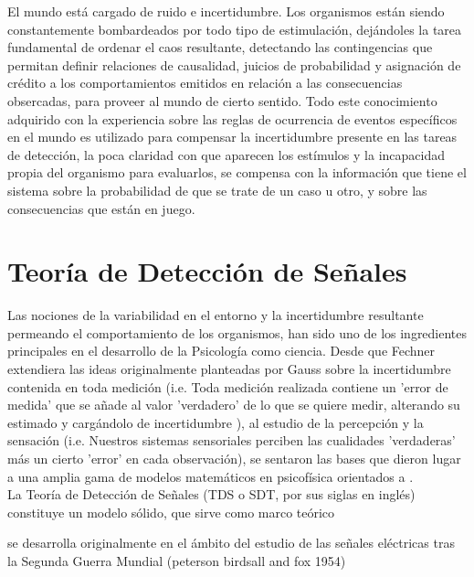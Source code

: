 El mundo está cargado de ruido e incertidumbre. Los organismos están siendo constantemente bombardeados por todo tipo de estimulación, dejándoles la tarea fundamental de ordenar el caos resultante, detectando las contingencias que permitan definir relaciones de causalidad, juicios de probabilidad y asignación de crédito a los comportamientos emitidos en relación a las consecuencias obsercadas, para proveer al mundo de cierto sentido. Todo este conocimiento adquirido con la experiencia sobre las reglas de ocurrencia de eventos específicos en el mundo es utilizado para compensar la incertidumbre presente en las tareas de detección, la poca claridad con que aparecen los estímulos y la incapacidad propia del organismo para evaluarlos, se compensa con la información que tiene el sistema sobre la probabilidad de que se trate de un caso u otro, y sobre las consecuencias que están en juego.\\ 

\section{Teoría de Detección de Señales}

Las nociones de la variabilidad en el entorno y la incertidumbre resultante permeando el comportamiento de los organismos, han sido uno de los ingredientes principales en el desarrollo de la Psicología como ciencia. Desde que Fechner extendiera las ideas originalmente planteadas por Gauss sobre la incertidumbre contenida en toda medición (i.e. Toda medición realizada contiene un 'error de medida' que se añade al valor 'verdadero' de lo que se quiere medir, alterando su estimado y cargándolo de incertidumbre ), al estudio de la percepción y la sensación (i.e. Nuestros sistemas sensoriales perciben las cualidades 'verdaderas' más un cierto 'error' en cada observación), se sentaron las bases que dieron lugar a una amplia gama de modelos matemáticos en psicofísica orientados a  .\\ 

La Teoría de Detección de Señales (TDS o SDT, por sus siglas en inglés) constituye un modelo sólido, que sirve como marco teórico  

se desarrolla originalmente en el ámbito del estudio de las señales eléctricas tras la Segunda Guerra Mundial  (peterson birdsall and fox 1954)

